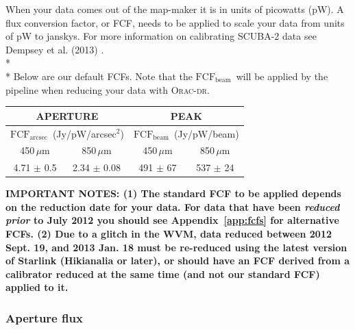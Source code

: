 \documentclass[twoside,11pt]{article}
\newcommand{\htmladdnormallink}[2]{#1}
\newcommand{\htmlref}[2]{#1}
\newcommand{\latexhtml}[2]{#1}
\renewcommand{\_}{\texttt{\symbol{95}}}
\newcommand{\fcfb}{$\mathrm{FCF_{beam}}$}
\newcommand{\fcfa}{$\mathrm{FCF_{arcsec}}$}
\newcommand{\oracdr}{\htmladdnormallink{\textsc{Orac-dr}}{http://www.oracdr.org/oracdr}}
\newcommand{\cref}[3]{\latexhtml{#1~\ref{#2}}{\htmlref{#3}{#2}}}
\begin{document}
When your data comes out of the map-maker it is in units of picowatts
(pW). A flux conversion factor, or FCF, needs to be applied to scale
your data from units of pW to janskys. For more information on calibrating
SCUBA-2 data see Dempsey et al. (2013) \cite{dempsey12}.
\\*\\*
Below are our default FCFs. Note that the \fcfb\ will be applied
by the pipeline when reducing your data with \oracdr.

\vspace{0.5cm}
\renewcommand*\arraystretch{1.2}
\begin{table}[h!]
\centering
\begin{tabular}{|c|c|c|c|}
\hline
\multicolumn{2}{|c|}{\textbf{APERTURE}}  &
\multicolumn{2}{c|}{\textbf{PEAK}}      \\
\hline
\multicolumn{2}{|c|}{\fcfa\ (Jy/pW/arcsec$^2$) }  &
\multicolumn{2}{c|}{\fcfb\ (Jy/pW/beam)}      \\
\hline
\hspace{0.4cm} 450\,$\mu$m \hspace{0.3cm} & 850\,$\mu$m & \hspace{0.4cm} 450\,$\mu$m \hspace{0.3cm}& 850\,$\mu$m \\
\hline
4.71 $\pm$ 0.5& 2.34 $\pm$ 0.08& 491 $\pm$ 67& 537 $\pm$ 24 \\
\hline
\end{tabular}
\end{table}
\renewcommand*\arraystretch{1.0}
\vspace{0.5cm}

\textbf{IMPORTANT NOTES:
  \newline
  (1) The standard FCF to be applied depends on
  the reduction date for your data. For data that have been
  \emph{reduced prior} to July 2012 you should see
  \cref{Appendix}{app:fcfs}{FCFs by Reduction Date} for alternative FCFs.
  \newline
  (2) Due to a glitch in the WVM, data reduced between 2012 Sept. 19,
  and 2013 Jan. 18 must be re-reduced using the latest version of
  Starlink (Hikianalia or later), or should have an FCF derived from a
  calibrator reduced at the same time (and not our standard FCF) applied
  to it.
}

\subsubsection{Aperture flux}
\end{document}
